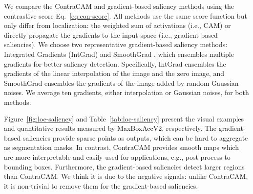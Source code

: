 We compare the ContraCAM and gradient-based saliency methods using the contrastive score Eq.~\eqref{eq:con-score}. All methods use the same score function but only differ from localization: the weighted sum of activations (i.e., CAM) or directly propagate the gradients to the input space (i.e., gradient-based saliencies). We choose two representative gradient-based saliency methods: Integrated Gradients (IntGrad) \citep{sundararajan2017axiomatic} and SmoothGrad \citep{smilkov2017smoothgrad}, which ensembles multiple gradients for better saliency detection. Specifically, IntGrad ensembles the gradients of the linear interpolation of the image and the zero image, and SmoothGrad ensembles the gradients of the image added by random Gaussian noises. We average ten gradients, either interpolation or Gaussian noises, for both methods.

Figure~\ref{fig:loc-saliency} and Table~\ref{tab:loc-saliency} present the visual examples and quantitative results measured by MaxBoxAccV2, respectively. The gradient-based saliencies provide sparse points as outputs, which can be hard to aggregate as segmentation masks. In contrast, ContraCAM provides smooth maps which are more interpretable and easily used for applications, e.g., post-process to bounding boxes. Furthermore, the gradient-based saliencies detect larger regions than ContraCAM. We think it is due to the negative signals: unlike ContraCAM, it is non-trivial to remove them for the gradient-based saliencies.


